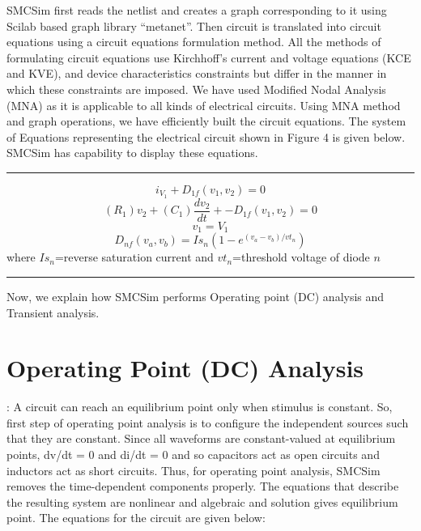 SMCSim first reads the netlist and creates a graph corresponding to it using Scilab based graph library “metanet”. Then circuit is translated into circuit equations using a circuit equations formulation method. All the methods of formulating circuit equations use Kirchhoff’s current and voltage equations (KCE and KVE), and device characteristics constraints but differ in the manner in which these constraints are imposed. We have used Modified Nodal Analysis (MNA) as it is applicable to all kinds of electrical circuits. Using MNA method and graph operations, we have efficiently built the circuit equations. The system of Equations representing the electrical circuit shown in Figure 4 is given below. SMCSim has capability to display these equations.\\


\hrule
\begin{equation}
     i_{V_1} + D_{1f}(v_1,v_2) = 0 
\end{equation}
\begin{equation}
     (R_1)v_2 + (C_1)\frac{dv_2}{dt} + -D_{1f}(v_1,v_2) = 0 
\end{equation}
\begin{equation}
     v_1 = V_1
\end{equation}
$$ D_{nf}(v_a,v_b)=Is_n(1-e^{(v_a-v_b)/vt_n})$$
 where $Is_n$=reverse saturation current and $vt_n$=threshold voltage of diode $n$\\
\hrule
\vspace{0.5cm}
Now, we explain how SMCSim performs Operating point (DC) analysis and Transient analysis.


\section {Operating Point (DC) Analysis}: 
A circuit can reach an equilibrium point only when stimulus is constant. So, first step of operating point analysis is to configure the independent sources such that they are constant. Since all waveforms are constant-valued at equilibrium points, dv/dt = 0 and di/dt = 0 and so capacitors act as open circuits and inductors act as short circuits. Thus, for operating point analysis, SMCSim removes the time-dependent components properly. The equations that describe the resulting system are nonlinear and algebraic and solution gives equilibrium point. The equations for the circuit are given below: \\


